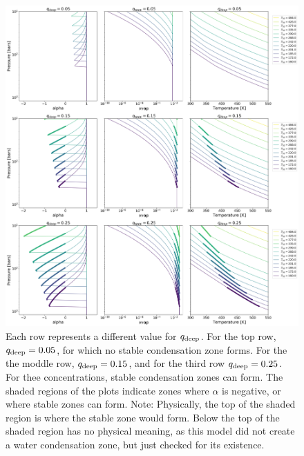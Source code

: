 \documentclass[11pt]{ucscthesisbs}
\begin{document}
\begin{figure}[ht!]
 \centerline{
  \includegraphics[scale=0.36]{figures/convection_inhibited_2.png}
 }
\caption[Inhibition of convection on Uranus]
{Each row represents a different value for $q_{\rm deep}$. For the top row, $q_{\rm deep} = 0.05$, for which no stable condensation zone forms. For the the moddle row, $q_{\rm deep} = 0.15$, and for the third row $q_{\rm deep} = 0.25$. For thee concentrations, stable condensation zones can form. The shaded regions of the plots indicate zones where $\alpha$ is negative, or where stable zones can form. Note: Physically, the top of the shaded region is where the stable zone would form. Below the top of the shaded region has no physical meaning, as this model did not create a water condensation zone, but just checked for its existence.}
\label{fig:convection_inhibited}
\end{figure}
\end{document}
